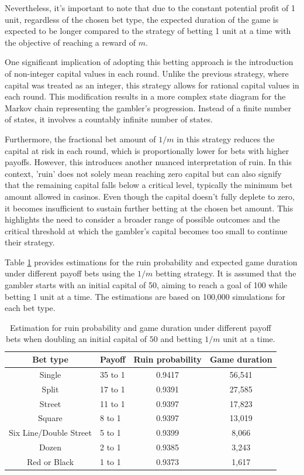 \documentclass[11pt,twoside]{article}
\numberwithin{Theorem}{section}
\numberwithin{Definition}{section}
\numberwithin{Lemma}{section}
\numberwithin{Algorithm}{section}
\numberwithin{equation}{section}
\begin{document}
Nevertheless, it's important to note that due to the constant potential profit of 1 unit, regardless of the chosen bet type, the expected duration of the game is expected to be longer compared to the strategy of betting 1 unit at a time with the objective of reaching a reward of $m$.

One significant implication of adopting this betting approach is the introduction of non-integer capital values in each round. Unlike the previous strategy, where capital was treated as an integer, this strategy allows for rational capital values in each round. This modification results in a more complex state diagram for the Markov chain representing the gambler's progression. Instead of a finite number of states, it involves a countably infinite number of states.

Furthermore, the fractional bet amount of $1/m$ in this strategy reduces the capital at risk in each round, which is proportionally lower for bets with higher payoffs. However, this introduces another nuanced interpretation of ruin. In this context, 'ruin' does not solely mean reaching zero capital but can also signify that the remaining capital falls below a critical level, typically the minimum bet amount allowed in casinos. Even though the capital doesn't fully deplete to zero, it becomes insufficient to sustain further betting at the chosen bet amount. This highlights the need to consider a broader range of possible outcomes and the critical threshold at which the gambler's capital becomes too small to continue their strategy.

Table \ref{diff_bets_1_m} provides estimations for the ruin probability and expected game duration under different payoff bets using the $1/m$ betting strategy. It is assumed that the gambler starts with an initial capital of 50, aiming to reach a goal of 100 while betting 1 unit at a time. The estimations are based on 100,000 simulations for each bet type.

\begin{table}[!ht]
\centering
\caption{Estimation for ruin probability and game duration under different payoff bets when doubling an initial capital of $50$ and betting $1/m$ unit at a time.}
\begin{tabular}{|c|l|c|c|}
\hline
Bet type  & Payoff & Ruin probability& Game duration\\
\hline\hline
Single & 35 to 1 & 0.9417&56,541\\
Split  &  17 to 1&0.9391&27,585\\
Street &  11 to 1&0.9397	&17,823\\
Square &  8 to 1&0.9397	&13,019\\
Six Line/Double Street  & 5 to 1&0.9399	&8,066\\
Dozen & 2 to 1&0.9385	&3,243\\
Red or Black & 1 to 1 &0.9373&1,617\\
\hline
\end{tabular}\label{diff_bets_1_m}
\end{table}
\end{document}

